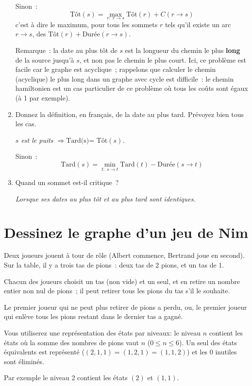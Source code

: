 \documentclass[11pt]{article}
\begin{document}
\begin{enumerate}
{Sinon~:
$$\mbox{Tôt}(s)= \max_{r:\; r\rightarrow s} \mbox{Tôt}(r)+ C(r\rightarrow s)$$
c'est à dire le maximum, pour tous les
sommets $r$ tels qu'il existe un arc $r\rightarrow s$,  des 
$\mbox{Tôt}(r)+\mbox{Durée}(r\rightarrow s)$.

Remarque~: la date au plus tôt de $s$ est la longueur du chemin le plus {\bf long} de la source jusqu'à $s$, et non pas le chemin le plus court. Ici, ce problème est facile car le graphe est acyclique~; rappelons que calculer le chemin (acyclique) le plus long dans un graphe avec cycle  est difficile~: le chemin hamiltonien est un cas particulier de ce problème où tous les coûts sont égaux (à 1 par exemple).
}

\item   Donnez la définition, en français, de la date au plus tard. Prévoyez bien tous les cas.

{\it
$s$ est le puits  $\Rightarrow \mbox{Tard(s)= Tôt}(s)$.

Sinon~:
$$\mbox{Tard}(s)=\min_{t:\; s\rightarrow t} \mbox{Tard}(t) - \mbox{Durée}(s\rightarrow t)$$
}

\item   Quand un sommet est-il critique~?

\emph{Lorsque ses dates au plus tôt et au plus tard sont identiques.}
\end{enumerate}

\section{Dessinez le graphe d'un jeu de Nim}
Deux joueurs jouent à tour de rôle (Albert commence, Bertrand joue en second). Sur la table, il y a trois tas de pions~:
deux tas de 2 pions, et un tas de 1.

\smallskip
Chacun des joueurs choisit un tas (non vide) et  un seul,
et en retire un nombre entier  non nul  de pions~; il peut retirer  tous les pions du tas s'il le souhaite.

\smallskip
Le premier joueur qui ne peut plus retirer de pions
a perdu, ou, le premier joueur qui enlève tous les pions restant dans le dernier tas a gagné. 

\medskip
Vous utiliserez une représentation des états par niveaux: le niveau $n$ contient les états où la somme des nombres de pions vaut $n$ ($0 \le n \le 6 $). Un seul des états équivalents est représenté ($(2, 1, 1)=(1, 2, 1)=(1, 1, 2)$) et les $0$ inutiles sont éliminés.

Par exemple le niveau 2 contient
les états $(2)$ et $(1, 1)$. 
\end{document}
